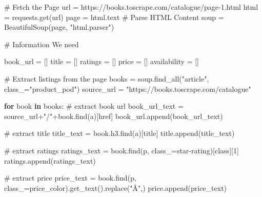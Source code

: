 \documentclass[
  letterpaper,
  DIV=11,
  numbers=noendperiod]{scrreprt}
\newenvironment{Shaded}{\begin{snugshade}}{\end{snugshade}}
\newcommand{\CommentTok}[1]{\textcolor[rgb]{0.37,0.37,0.37}{#1}}
\newcommand{\ControlFlowTok}[1]{\textcolor[rgb]{0.00,0.23,0.31}{\textbf{#1}}}
\newcommand{\DecValTok}[1]{\textcolor[rgb]{0.68,0.00,0.00}{#1}}
\newcommand{\KeywordTok}[1]{\textcolor[rgb]{0.00,0.23,0.31}{\textbf{#1}}}
\newcommand{\NormalTok}[1]{\textcolor[rgb]{0.00,0.23,0.31}{#1}}
\newcommand{\OperatorTok}[1]{\textcolor[rgb]{0.37,0.37,0.37}{#1}}
\newcommand{\StringTok}[1]{\textcolor[rgb]{0.13,0.47,0.30}{#1}}
\begin{document}
\begin{Shaded}
\begin{Highlighting}[]
\CommentTok{\# Fetch the Page }
\NormalTok{url }\OperatorTok{=} \StringTok{\textquotesingle{}https://books.toscrape.com/catalogue/page{-}1.html\textquotesingle{}}
\NormalTok{html }\OperatorTok{=}\NormalTok{ requests.get(url)}
\NormalTok{page }\OperatorTok{=}\NormalTok{ html.text}
\CommentTok{\# Parse HTML Content}
\NormalTok{soup }\OperatorTok{=}\NormalTok{ BeautifulSoup(page, }\StringTok{"html.parser"}\NormalTok{)}

\CommentTok{\# Information We need }

\NormalTok{book\_url }\OperatorTok{=}\NormalTok{ []}
\NormalTok{title }\OperatorTok{=}\NormalTok{ []}
\NormalTok{ratings }\OperatorTok{=}\NormalTok{ []}
\NormalTok{price }\OperatorTok{=}\NormalTok{ []}
\NormalTok{availability }\OperatorTok{=}\NormalTok{ []}

\CommentTok{\# Extract listings from the page}
\NormalTok{books }\OperatorTok{=}\NormalTok{ soup.find\_all(}\StringTok{"article"}\NormalTok{, class\_}\OperatorTok{=}\StringTok{"product\_pod"}\NormalTok{)}
\NormalTok{source\_url }\OperatorTok{=} \StringTok{"https://books.toscrape.com/catalogue"}

\ControlFlowTok{for}\NormalTok{ book }\KeywordTok{in}\NormalTok{ books:}
    \CommentTok{\# extract book url }
\NormalTok{    book\_url\_text }\OperatorTok{=}\NormalTok{ source\_url}\OperatorTok{+}\StringTok{"/"}\OperatorTok{+}\NormalTok{book.find(}\StringTok{\textquotesingle{}a\textquotesingle{}}\NormalTok{)[}\StringTok{\textquotesingle{}href\textquotesingle{}}\NormalTok{]}
\NormalTok{    book\_url.append(book\_url\_text)}

    \CommentTok{\# extract title }
\NormalTok{    title\_text }\OperatorTok{=}\NormalTok{ book.h3.find(}\StringTok{\textquotesingle{}a\textquotesingle{}}\NormalTok{)[}\StringTok{\textquotesingle{}title\textquotesingle{}}\NormalTok{]}
\NormalTok{    title.append(title\_text)}

    \CommentTok{\# extract ratings }
\NormalTok{    ratings\_text }\OperatorTok{=}\NormalTok{ book.find(}\StringTok{\textquotesingle{}p\textquotesingle{}}\NormalTok{, class\_}\OperatorTok{=}\StringTok{\textquotesingle{}star{-}rating\textquotesingle{}}\NormalTok{)[}\StringTok{\textquotesingle{}class\textquotesingle{}}\NormalTok{][}\DecValTok{1}\NormalTok{]}
\NormalTok{    ratings.append(ratings\_text)}

    \CommentTok{\# extract price }
\NormalTok{    price\_text }\OperatorTok{=}\NormalTok{ book.find(}\StringTok{\textquotesingle{}p\textquotesingle{}}\NormalTok{, class\_}\OperatorTok{=}\StringTok{\textquotesingle{}price\_color\textquotesingle{}}\NormalTok{).get\_text().replace(}\StringTok{"Â"}\NormalTok{,}\StringTok{\textquotesingle{}\textquotesingle{}}\NormalTok{)}
\NormalTok{    price.append(price\_text)}


\end{Highlighting}
\end{Shaded}
\end{document}
